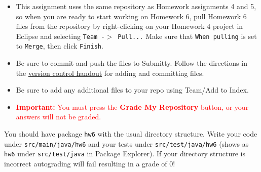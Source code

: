 \documentclass[11pt]{article}
\begin{document}
\noindent{}
\par


\begin{itemize}
\item  
This assignment uses the same repository as Homework assignments 4 and 5, so when you are ready to start working on Homework 6, pull Homework 6 files from the repository by right-clicking on your Homework 4 project in Eclipse and selecting \texttt{Team -$>$ Pull...} Make sure that \texttt{When pulling} is set to \texttt{Merge}, then click \texttt{Finish}.

\item
Be sure to commit and push the files to Submitty. Follow the directions in the \href{https://www.cs.rpi.edu/academics/courses/spring23/csci2600/Documents/eclipse_and_git.pdf}{version control handout} for adding and committing files.

\item
Be sure to add any additional files to your repo using Team/Add to Index.

\item
\textcolor{red}{\textbf{Important:} You must press the \textbf{Grade My Repository} button, or your answers will not be graded.}
\end{itemize}

\newline

\noindent You should have package 
\texttt{hw6} with the usual directory structure. Write your code under \texttt{src/main/java/hw6} and your tests under \texttt{src/test/java/hw6} (shows as \texttt{hw6} under \texttt{src/test/java} in Package Explorer). If your directory structure is incorrect autograding will fail resulting in a grade of 0!

\newline
\end{document}
